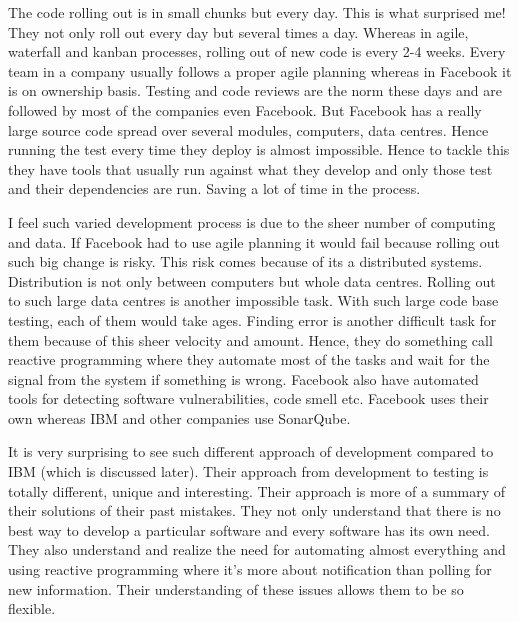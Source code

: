 The code rolling out is in small chunks but every day. This is what surprised me! They not only roll out every day but several times a day. Whereas in agile, waterfall and kanban processes, rolling out of new code is every 2-4 weeks. Every team in a company usually follows a proper agile planning whereas in Facebook it is on ownership basis. Testing and code reviews are the norm these days and are followed by most of the companies even Facebook. But Facebook has a really large source code spread over several modules, computers, data centres. Hence running the test every time they deploy is almost impossible. Hence to tackle this they have tools that usually run against what they develop and only those test and their dependencies are run. Saving a lot of time in the process.

I feel such varied development process is due to the sheer number of computing and data. If Facebook had to use agile planning it would fail because rolling out such big change is risky. This risk comes because of its a distributed systems. Distribution is not only between computers but whole data centres. Rolling out to such large data centres is another impossible task. With such large code base testing, each of them would take ages. Finding error is another difficult task for them because of this sheer velocity and amount. Hence, they do something call reactive programming where they automate most of the tasks and wait for the signal from the system if something is wrong. Facebook also have automated tools for detecting software vulnerabilities, code smell etc. Facebook uses their own whereas IBM and other companies use SonarQube.

It is very surprising to see such different approach of development compared to IBM (which is discussed later). Their approach from development to testing is totally different, unique and interesting. Their approach is more of a summary of their solutions of their past mistakes. They not only understand that there is no best way to develop a particular software and every software has its own need. They also understand and realize the need for automating almost everything and using reactive programming where it's more about notification than polling for new information. Their understanding of these issues allows them to be so flexible.
